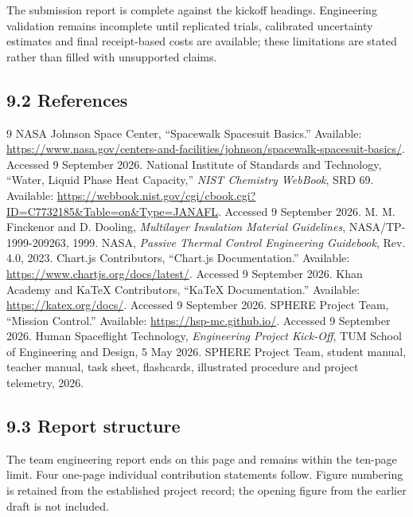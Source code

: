 \documentclass[9pt,a4paper]{extarticle}
\begin{document}
The submission report is complete against the kickoff headings. Engineering validation remains incomplete until replicated trials, calibrated uncertainty estimates and final receipt-based costs are available; these limitations are stated rather than filled with unsupported claims.

\subsection*{9.2 References}
\begingroup
\small
\sloppy
\setlength{\itemsep}{1pt}
\begin{thebibliography}{9}
 NASA Johnson Space Center, ``Spacewalk Spacesuit Basics.'' Available: \url{https://www.nasa.gov/centers-and-facilities/johnson/spacewalk-spacesuit-basics/}. Accessed 9 September 2026.
 National Institute of Standards and Technology, ``Water, Liquid Phase Heat Capacity,'' \emph{NIST Chemistry WebBook}, SRD 69. Available: \url{https://webbook.nist.gov/cgi/cbook.cgi?ID=C7732185&Table=on&Type=JANAFL}. Accessed 9 September 2026.
 M. M. Finckenor and D. Dooling, \emph{Multilayer Insulation Material Guidelines}, NASA/TP-1999-209263, 1999.
 NASA, \emph{Passive Thermal Control Engineering Guidebook}, Rev. 4.0, 2023.
 Chart.js Contributors, ``Chart.js Documentation.'' Available: \url{https://www.chartjs.org/docs/latest/}. Accessed 9 September 2026.
 Khan Academy and KaTeX Contributors, ``KaTeX Documentation.'' Available: \url{https://katex.org/docs/}. Accessed 9 September 2026.
 SPHERE Project Team, ``Mission Control.'' Available: \url{https://hsp-mc.github.io/}. Accessed 9 September 2026.
 Human Spaceflight Technology, \emph{Engineering Project Kick-Off}, TUM School of Engineering and Design, 5 May 2026.
 SPHERE Project Team, student manual, teacher manual, task sheet, flashcards, illustrated procedure and project telemetry, 2026.
\end{thebibliography}
\endgroup

\subsection*{9.3 Report structure}
The team engineering report ends on this page and remains within the ten-page limit. Four one-page individual contribution statements follow. Figure numbering is retained from the established project record; the opening figure from the earlier draft is not included.
\end{document}
